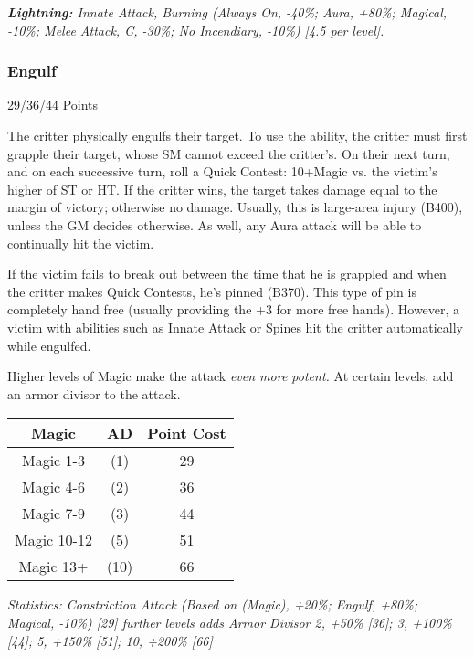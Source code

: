 \begin{multicols*}{3}
	\textcolor{OliveGreen}{\textit{\textbf{Lightning:} Innate Attack, Burning (Always On, -40\%; Aura, +80\%; Magical, -10\%; Melee Attack, C, -30\%; No Incendiary, -10\%) [4.5 per level].}}
	
	
	\subsubsection{Engulf}\label{engulf}
	\begin{flushright}
		29/36/44 Points
	\end{flushright}
	
	The critter physically engulfs their target. To use the ability, the critter must first grapple their target, whose SM cannot exceed the critter's. On their next turn, and on each successive turn, roll a Quick Contest: 10+Magic vs. the victim's higher of ST or HT. If the critter wins, the target takes damage equal to the margin of victory; otherwise no damage. Usually, this is large-area injury (B400), unless the GM decides otherwise. As well, any Aura attack will be able to continually hit the victim.
	
	If the victim fails to break out between the time that he is grappled and when the critter makes Quick Contests, he's pinned (B370). This type of pin is completely hand free (usually providing the +3 for more free hands). However, a victim with abilities such as Innate Attack or Spines hit the critter automatically while engulfed.
	
	Higher levels of Magic make the attack \textit{even more potent.} At certain levels, add an armor divisor to the attack.
	
	\begin{center}
		\begin{tabular}{|c|c|c|}
			\hline
			Magic & AD & Point Cost\\
			\hline
			\hline
			Magic 1-3 & (1) & 29 \\
			Magic 4-6 & (2) & 36 \\
			Magic 7-9 & (3) & 44 \\
			Magic 10-12 & (5) & 51 \\
			Magic 13+ & (10) & 66 \\
			\hline
		\end{tabular}
	\end{center}
	
	\textcolor{OliveGreen}{\textit{Statistics: Constriction Attack (Based on (Magic), +20\%; Engulf, +80\%; Magical, -10\%) [29] further levels adds Armor Divisor 2, +50\% [36]; 3, +100\% [44]; 5, +150\% [51]; 10, +200\% [66]}}
	

\end{multicols*}
